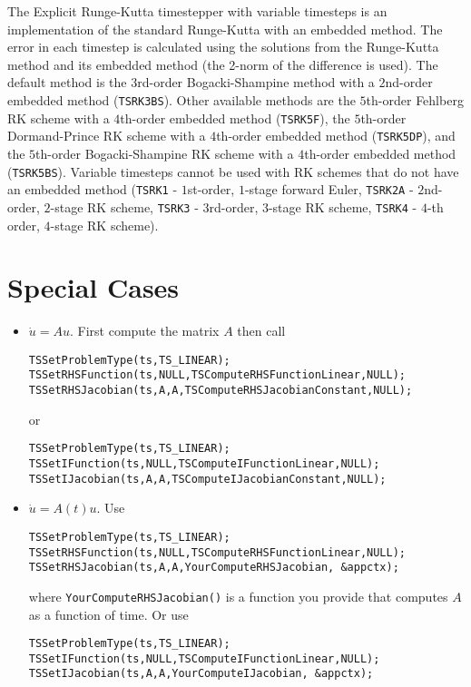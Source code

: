 The Explicit Runge-Kutta timestepper with variable timesteps is an 
implementation of the standard Runge-Kutta with an embedded method. The error in each
timestep is calculated using the solutions from the Runge-Kutta method and its embedded
method (the 2-norm of the difference is used). The default method is the 
$3$rd-order Bogacki-Shampine method with a $2$nd-order embedded method (\lstinline{TSRK3BS}).
Other available methods are the  $5$th-order Fehlberg RK scheme with a $4$th-order embedded
method (\lstinline{TSRK5F}), the  $5$th-order Dormand-Prince RK scheme with a $4$th-order embedded method
(\lstinline{TSRK5DP}), and the  $5$th-order Bogacki-Shampine RK scheme with a $4$th-order embedded method
(\lstinline{TSRK5BS}). Variable timesteps cannot be used with RK schemes that do not have an embedded
method (\lstinline{TSRK1} - $1$st-order, $1$-stage forward Euler, \lstinline{TSRK2A} - $2$nd-order, $2$-stage RK scheme,
\lstinline{TSRK3} - $3$rd-order, $3$-stage RK scheme, \lstinline{TSRK4} - $4$-th order, $4$-stage RK scheme).

\section{Special Cases}

\begin{itemize}
\item $ \dot{u} = A u.$ First compute the matrix $ A$ then call
\begin{lstlisting}
TSSetProblemType(ts,TS_LINEAR);
TSSetRHSFunction(ts,NULL,TSComputeRHSFunctionLinear,NULL); 
TSSetRHSJacobian(ts,A,A,TSComputeRHSJacobianConstant,NULL);
\end{lstlisting}
or
\begin{lstlisting}
TSSetProblemType(ts,TS_LINEAR);
TSSetIFunction(ts,NULL,TSComputeIFunctionLinear,NULL); 
TSSetIJacobian(ts,A,A,TSComputeIJacobianConstant,NULL);
\end{lstlisting}

\item $ \dot{u} = A(t) u.$ Use
\begin{lstlisting}
TSSetProblemType(ts,TS_LINEAR);
TSSetRHSFunction(ts,NULL,TSComputeRHSFunctionLinear,NULL); 
TSSetRHSJacobian(ts,A,A,YourComputeRHSJacobian, &appctx);
\end{lstlisting}
where {\tt YourComputeRHSJacobian()} is a function you provide that computes $A$ as a function of time. Or use
\begin{lstlisting}
TSSetProblemType(ts,TS_LINEAR);
TSSetIFunction(ts,NULL,TSComputeIFunctionLinear,NULL); 
TSSetIJacobian(ts,A,A,YourComputeIJacobian, &appctx);
\end{lstlisting}

\end{itemize}

